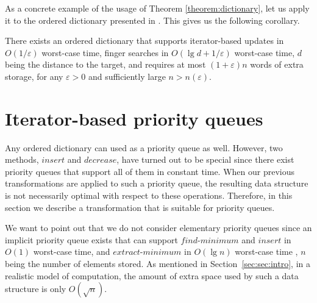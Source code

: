 \documentclass{DIKU-article}
\newcommand{\Findmin}{\mbox{$\mathit{find}$\textnormal{-}}\allowbreak{}\mbox{$\mathit{minimum}$}}
\newcommand{\Findmax}{\mbox{$\mathit{find}$\textnormal{-}}\allowbreak{}\mbox{$\mathit{maximum}$}}
\newcommand{\Insert}{\mbox{$\mathit{insert}$}}
\newcommand{\Extractmin}{\mbox{$\mathit{extract}$\textnormal{-}$\mathit{minimum}$}}
\newcommand{\Extractmax}{\mbox{$\mathit{extract}$\textnormal{-}$\mathit{maximum}$}}
\newcommand{\Decrease}{\mbox{$\mathit{decrease}$}}
\newcommand{\seclabel}[1]{\label{sec:#1}}
\newcommand{\secref}[1]{\mbox{Section~\ref{sec:#1}}}
\begin{document}
As a concrete example of the usage of Theorem
\ref{theorem:dictionary}, let us apply it to the ordered dictionary
presented in \cite{BLMTT03}. This gives us the following corollary.

\begin{corollary}
\label{corollary:dictionary}
There exists an ordered dictionary that supports iterator-based
updates in $O(1/\varepsilon)$ worst-case time, finger searches in
$O(\lg d + 1/\varepsilon)$ worst-case time, $d$ being the distance to
the target, and requires at most $(1 + \varepsilon)n$ words of
extra storage, for any $\varepsilon > 0$ and sufficiently large
$n > n(\varepsilon)$.
\end{corollary}

\section{Iterator-based priority queues}\seclabel{iterator-queues}

Any ordered dictionary can used as a priority queue as well. However,
two methods, \Insert{} and \Decrease{}, have turned out to be special
since there exist priority queues that support all of them in constant
time.  When our previous transformations are applied to such a
priority queue, the resulting data structure is not necessarily
optimal with respect to these operations. Therefore, in this section
we describe a transformation that is suitable for priority queues.

We want to point out that we do not consider elementary priority
queues since an implicit priority queue exists that can support
\Findmin{} and \Insert{} in $O(1)$ worst-case time, and \Extractmin{} in
$O(\lg n)$ worst-case time \cite{CMP88}, $n$ being the number of
elements stored. As mentioned in \secref{sec:intro}, in a realistic
model of computation, the amount of extra space used by such a data
structure is only $O(\sqrt{n})$.%
\end{document}

